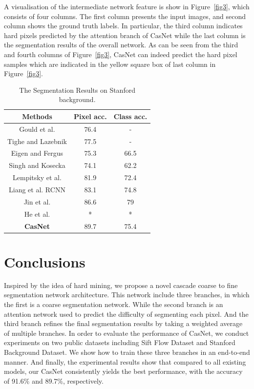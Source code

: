\documentclass[10.5pt,compsoc]{TsT}
\newcommand{\upcite}[1]{\superscript{\textsuperscript{\cite{#1}}}}
\theoremstyle{mystyle}
\newcommand{\upcite}[1]{\textsuperscript{\cite{#1}}}
\begin{document}
A visualisation of the intermediate network feature is show in Figure~\ref{fig3}, which consists of four columns. The first column presents the input images, and second column shows the ground truth labels. In particular, the third column indicates hard pixels predicted by the attention branch of CasNet while the last column is the segmentation results of the overall network. As can be seen from the third and fourth columns of Figure~\ref{fig3}, CasNet can indeed predict the hard pixel samples which are indicated in the yellow square box of last column in Figure~\ref{fig3}.



\begin{table}[htbp]
\large
\setlength{\belowcaptionskip}{10pt}
\caption{The Segmentation Results on Stanford background.}
\label{table2}
\centering
\begin{tabular}{ccc}
\hline 
Methods & Pixel acc. & Class acc. \\
\hline
Gould et al.\upcite{7} & 76.4 & - \\
Tighe and Lazebnik\upcite{25} & 77.5 & - \\
Eigen and Fergus\upcite{28} & 75.3 & 66.5 \\
Singh and Kosecka\upcite{27} & 74.1 & 62.2 \\
Lempitsky et al.\upcite{10} & 81.9 & 72.4 \\
Liang et al. RCNN\upcite{24} & 83.1 & 74.8 \\
Jin et al. \upcite{37} & 86.6 & 79 \\
He et al. \upcite{1} & * & * \\
\textbf{CasNet} & 89.7 & 75.4 \\
\hline
\end{tabular}
\end{table}


\section{Conclusions}
\noindent

Inspired by the idea of hard mining, we propose a novel cascade coarse to fine segmentation network architecture.
This network include three branches, in which the first is a coarse segmentation network.
While the second branch is an attention network used to predict the difficulty of segmenting each pixel.
And the third branch refines the final segmentation results by taking a weighted average of multiple branches.
In order to evaluate the performance of CasNet, we conduct experiments on two public datasets including Sift Flow Dataset and Stanford Background Dataset. 
We show how to train these three branches in an end-to-end manner. And finally, the experimental results show that compared to all existing models, our CasNet consistently yields the best performance, with the accuracy of 91.6\% and 89.7\%, respectively.
\end{document}
